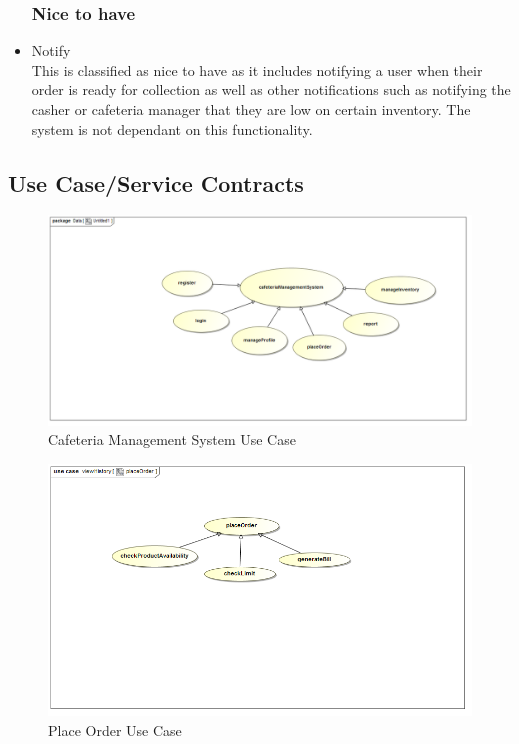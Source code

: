 \documentclass[a4paper,12pt]{article}
\begin{document}
\begin{itemize}
\subsubsection{Nice to have}
\item Notify \\
This is classified as nice to have as it includes notifying a user when their order is ready for collection as well as other notifications such as notifying the casher or cafeteria manager that they are low on certain inventory.  The system is not dependant on this functionality.

\end{itemize}

\subsection{Use Case/Service Contracts}

\begin{figure}[H]
  \centering
    \includegraphics[width=1.0\textwidth]{images/CMSUseCase.png}
    \caption{Cafeteria Management System Use Case} 
\end{figure}

\begin{figure}[H]
  \centering
    \includegraphics[width=1.0\textwidth]{images/placeOrder.png}
    \caption{Place Order Use Case} 
\end{figure}
\end{document}
